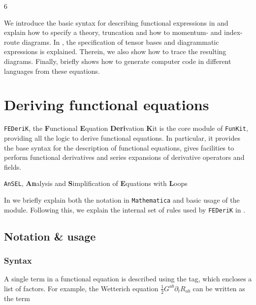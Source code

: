 6\documentclass[10pt,prd,nofootinbib,superscriptaddress,twocolumn]{revtex4-2}
\newcommand{\mathem}{\mmaInlineCell{Code}}
\newcommand{\FunKit}{\texttt{FunKit}\xspace}
\newcommand{\FEDeriK}{\texttt{FEDeriK}\xspace}
\newcommand{\AnSEL}{\texttt{AnSEL}\xspace}
\begin{document}
We introduce the basic syntax for describing functional expressions in  and explain how to specify a theory, truncation and how to momentum- and index-route diagrams.
In , the specification of tensor bases and diagrammatic expressions is explained. Therein, we also show how to trace the resulting diagrams.
Finally,  briefly shows how to generate computer code in different languages from these equations.


\section{Deriving functional equations}
\label{sec:FEDeriK}

\FEDeriK, the {\textbf{F}unctional \textbf{E}quation \textbf{Deri}vation \textbf{K}it} is the core module of \FunKit, providing all the logic to derive functional equations. In particular, it provides the base syntax for the description of functional equations, gives facilities to perform functional derivatives and series expansions of derivative operators and fields.


\AnSEL, \textbf{An}alysis and \textbf{S}implification of \textbf{E}quations with \textbf{L}oops

In  we briefly explain both the notation in \texttt{Mathematica} and basic usage of the module. Following this, we explain the internal set of rules used by \FEDeriK in .


\subsection{Notation \& usage}
\label{sec:FEDeriK_notation}

\subsubsection{Syntax}

A single term in a functional equation is described using the \mathem{\mmaDef{FTerm}} tag, which encloses a list of factors. For example, the Wetterich equation $\frac{1}{2}G^{ab}\partial_tR_{ab}$ can be written as the term
%
\end{document}

